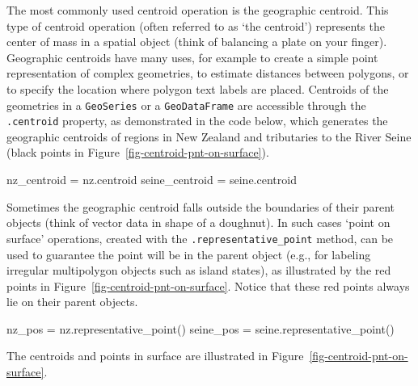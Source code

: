 \documentclass[
  letterpaper,
]{krantz}
\newenvironment{Shaded}{\begin{snugshade}}{\end{snugshade}}
\newcommand{\NormalTok}[1]{\textcolor[rgb]{0.00,0.23,0.31}{#1}}
\newcommand{\OperatorTok}[1]{\textcolor[rgb]{0.37,0.37,0.37}{#1}}
\begin{document}
The most commonly used centroid operation is the geographic centroid.
This type of centroid operation (often referred to as `the centroid')
represents the center of mass in a spatial object (think of balancing a
plate on your finger). Geographic centroids have many uses, for example
to create a simple point representation of complex geometries, to
estimate distances between polygons, or to specify the location where
polygon text labels are placed. Centroids of the geometries in a
\texttt{GeoSeries} or a \texttt{GeoDataFrame} are accessible through the
\texttt{.centroid} property, as demonstrated in the code below, which
generates the geographic centroids of regions in New Zealand and
tributaries to the River Seine (black points in
Figure~\ref{fig-centroid-pnt-on-surface}).

\begin{Shaded}
\begin{Highlighting}[]
\NormalTok{nz\_centroid }\OperatorTok{=}\NormalTok{ nz.centroid}
\NormalTok{seine\_centroid }\OperatorTok{=}\NormalTok{ seine.centroid}
\end{Highlighting}
\end{Shaded}

Sometimes the geographic centroid falls outside the boundaries of their
parent objects (think of vector data in shape of a doughnut). In such
cases `point on surface' operations, created with the
\texttt{.representative\_point} method, can be used to guarantee the
point will be in the parent object (e.g., for labeling irregular
multipolygon objects such as island states), as illustrated by the red
points in Figure~\ref{fig-centroid-pnt-on-surface}. Notice that these
red points always lie on their parent objects.

\begin{Shaded}
\begin{Highlighting}[]
\NormalTok{nz\_pos }\OperatorTok{=}\NormalTok{ nz.representative\_point()}
\NormalTok{seine\_pos }\OperatorTok{=}\NormalTok{ seine.representative\_point()}
\end{Highlighting}
\end{Shaded}

The centroids and points in surface are illustrated in
Figure~\ref{fig-centroid-pnt-on-surface}.
\end{document}

